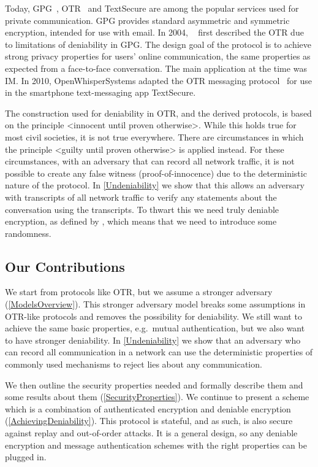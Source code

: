 Today, \ac{GPG}~\cite{gpg}, \ac{OTR}~\cite{otr} and Text\-Secure 
\cite{textsecure} are among the popular services used for private 
communication.
\ac{GPG} provides standard asymmetric and symmetric encryption, intended for 
use with email.
In 2004, \citeauthor{otr2004}~\cite{otr2004} first described the \ac{OTR} due 
to limitations of deniability in \ac{GPG}.
The design goal of the protocol is to achieve strong privacy properties for 
users' online communication, the same properties as expected from 
a face-to-face conversation.
The main application at the time was \ac{IM}.
In 2010, OpenWhisperSystems adapted the \ac{OTR} messaging 
protocol~\cite{frosch2014secure} for use in the smartphone text-messaging app 
TextSecure.

The construction used for deniability in \ac{OTR}, and the derived protocols, 
is based on the principle <innocent until proven otherwise>.
While this holds true for most civil societies, it is not true everywhere.
There are circumstances in which the principle <guilty until proven otherwise> 
is applied instead.
For these circumstances, with an adversary that can record all network traffic, 
it is not possible to create any false witness (proof-of-innocence) due to the 
deterministic nature of the protocol.
In \cref{Undeniability} we show that this allows an adversary with 
transcripts of all network traffic to verify any statements about the 
conversation using the transcripts.
To thwart this we need truly deniable encryption, as defined by 
\citet{DeniableEncryption}, which means that we need to introduce some 
randomness.

\subsection{Our Contributions}
\label{Contributions}

We start from protocols like \ac{OTR}, but we assume a stronger adversary 
(\cref{ModelsOverview}).
This stronger adversary model breaks some assumptions in \ac{OTR}-like 
protocols and removes the possibility for deniability.
We still want to achieve the same basic properties, e.g.~mutual authentication, 
but we also want to have stronger deniability.
In \cref{Undeniability} we show that an adversary who can record all 
communication in a network can use the deterministic properties of commonly 
used mechanisms to reject lies about any communication.

We then outline the security properties needed and formally describe them and 
some results about them (\cref{SecurityProperties}).
We continue to present a scheme which is a combination of authenticated 
encryption and deniable encryption (\cref{AchievingDeniability}).
This protocol is stateful, and as such, is also secure against replay and 
out-of-order attacks.
It is a general design, so any deniable encryption and message authentication 
schemes with the right properties can be plugged in.

